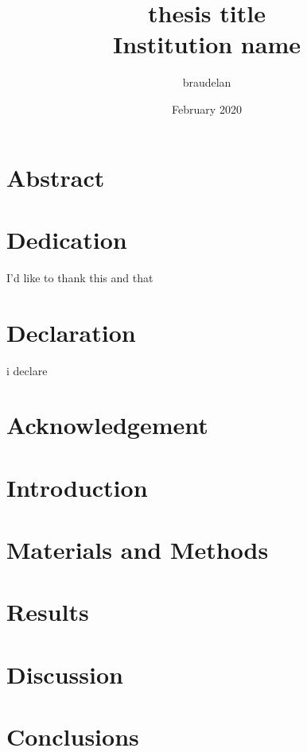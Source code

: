 \documentclass[12pt]{report}
\title{
    {thesis title}\\
    {\large Institution name}\\
}
\author{braudelan }
\date{February 2020}
\begin{document}
	\maketitle

	\chapter*{Abstract}
	    

	\chapter*{Dedication}
	    I'd like to thank this and that

	\chapter*{Declaration}
	    i declare

	\chapter*{Acknowledgement}
	\tableofcontents

	\chapter{Introduction}
	    

	\chapter{Materials and Methods}
	    

	\chapter{Results}
	    

	\chapter{Discussion}
  		

	\chapter{Conclusions}
		



\end{document}
